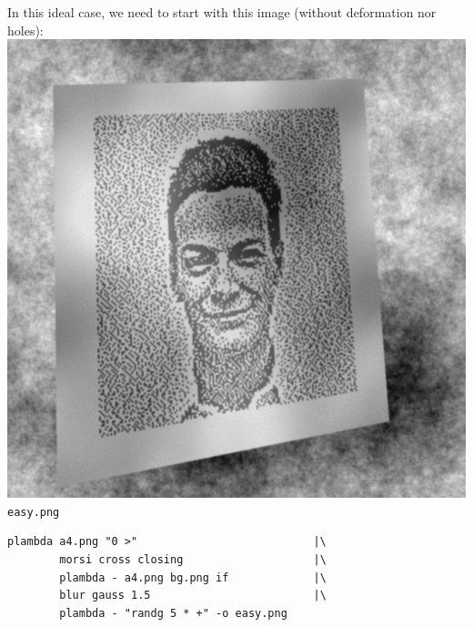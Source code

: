 In this ideal case, we need to start with this image (without deformation nor
holes):
\includegraphics{easy.png}\verb+easy.png+
\begin{verbatim}
plambda a4.png "0 >"                           |\
        morsi cross closing                    |\
        plambda - a4.png bg.png if             |\
        blur gauss 1.5                         |\
        plambda - "randg 5 * +" -o easy.png
\end{verbatim}

